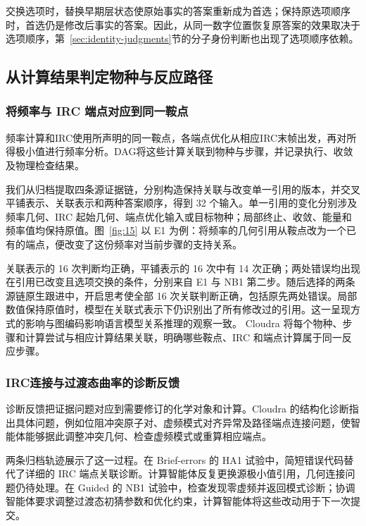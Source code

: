 交换选项时，替换早期层状态使原始事实的答案重新成为首选；保持原选项顺序时，首选仍是修改后事实的答案。因此，从同一数字位置恢复原答案的效果取决于选项顺序，第~\ref{sec:identity-judgments}节的分子身份判断也出现了选项顺序依赖。

\subsection{从计算结果判定物种与反应路径}

\subsubsection{将频率与 IRC 端点对应到同一鞍点}

频率计算和IRC使用所声明的同一鞍点，各端点优化从相应IRC末帧出发，再对所得极小值进行频率分析。DAG将这些计算关联到物种与步骤，并记录执行、收敛及物理检查结果。

我们从归档提取四条源证据链，分别构造保持关联与改变单一引用的版本，并交叉平铺表示、关联表示和两种答案顺序，得到 32 个输入。单一引用的变化分别涉及频率几何、IRC 起始几何、端点优化输入或目标物种；局部终止、收敛、能量和频率值均保持原值。图~\ref{fig:15} 以 E1 为例：将频率的几何引用从鞍点改为一个已有的端点，便改变了这份频率对当前步骤的支持关系。

关联表示的 16 次判断均正确，平铺表示的 16 次中有 14 次正确；两处错误均出现在引用已改变且选项交换的条件，分别来自 E1 与 NB1 第二步。随后选择的两条源链原生跟进中，开启思考使全部 16 次关联判断正确，包括原先两处错误。局部数值保持原值时，模型在关联式表示下仍识别出了所有修改过的引用。这一呈现方式的影响与图编码影响语言模型关系推理的观察一致。\citep{ref17} Cloudra 将每个物种、步骤和计算尝试与相应计算结果关联，明确哪些鞍点、IRC 和端点计算属于同一反应步骤。

\subsubsection{IRC连接与过渡态曲率的诊断反馈}

诊断反馈把证据问题对应到需要修订的化学对象和计算。Cloudra 的结构化诊断指出具体问题，例如位阻冲突原子对、虚频模式对齐异常及路径端点连接问题，使智能体能够据此调整冲突几何、检查虚频模式或重算相应端点。

两条归档轨迹展示了这一过程。在 Brief-errors 的 HA1 试验中，简短错误代码替代了详细的 IRC 端点关联诊断。计算智能体反复更换源极小值引用，几何连接问题仍待处理。在 Guided 的 NB1 试验中，检查发现零虚频并返回模式诊断；协调智能体要求调整过渡态初猜参数和优化约束，计算智能体将这些改动用于下一次提交。\citep{ref18}

